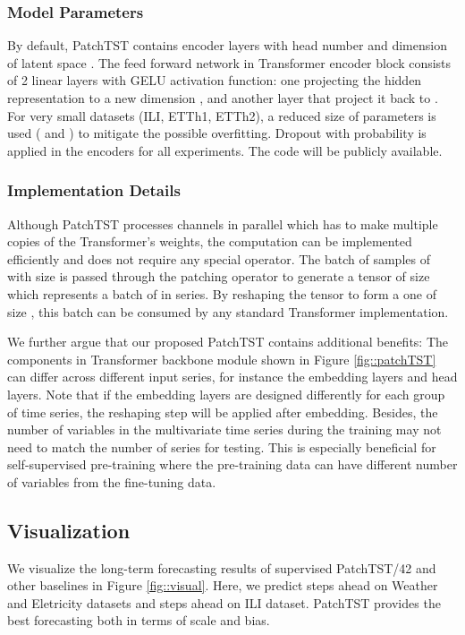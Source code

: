 \documentclass{article} \usepackage{iclr2023_conference,times}
\begin{document}
\subsubsection{Model Parameters}

By default, PatchTST contains  encoder layers with head number  and dimension of latent space . The feed forward network in Transformer encoder block consists of 2 linear layers with GELU \citep{gelu} activation function: one projecting the hidden representation  to a new dimension , and another layer that project it back to . For very small datasets (ILI, ETTh1, ETTh2), a reduced size of parameters is used ( and ) to mitigate the possible overfitting. Dropout with probability  is applied in the encoders for all experiments. The code will be publicly available.

\subsubsection{Implementation Details}
\label{sec::implementation details}

Although PatchTST processes channels in parallel which has to make multiple copies of the Transformer's weights, the computation can be implemented efficiently and does not require any special operator. The batch of samples of  with size  is passed through the patching operator to generate a  tensor of size  which represents a batch of  in  series. By reshaping the tensor to form a  one of size , this batch can be consumed by any standard Transformer implementation. 

We further argue that our proposed PatchTST contains additional benefits: The components in Transformer backbone module shown in Figure \ref{fig::patchTST} can differ across different input series, for instance the embedding layers and head layers. Note that if the embedding layers are designed differently for each group of time series, the reshaping step will be applied after embedding. Besides, the number of variables in the multivariate time series during the training may not need to match the number of series for testing. This is especially beneficial for self-supervised pre-training where the pre-training data can have different number of variables from the fine-tuning data. 

\subsection{Visualization}

We visualize the long-term forecasting results of supervised PatchTST/42 and other baselines in Figure \ref{fig::visual}. Here, we predict  steps ahead on Weather and Eletricity datasets and  steps ahead on ILI dataset. PatchTST provides the best forecasting both in terms of scale and bias.
\end{document}

